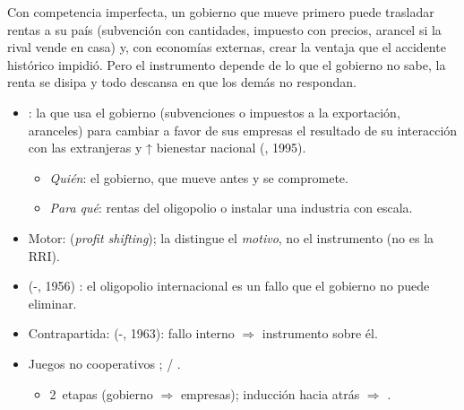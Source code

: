 \documentclass{article}
\begin{document}
\begin{columnas}
\begin{ideaclave}
Con competencia imperfecta, un gobierno que mueve primero puede trasladar rentas a su país (subvención con cantidades, impuesto con precios, arancel si la rival vende en casa) y, con economías externas, crear la ventaja que el accidente histórico impidió. Pero el instrumento depende de lo que el gobierno no sabe, la renta se disipa y todo descansa en que los demás no respondan.
\end{ideaclave}

\begin{itemize}
\item {}: la que usa el gobierno (subvenciones o impuestos a la exportación, aranceles) para cambiar a favor de sus empresas el resultado de su interacción con las extranjeras y ↑ bienestar nacional (, 1995).
  \begin{itemize}
  \item \emph{Quién}: el gobierno, que mueve antes y se compromete.
  \item \emph{Para qué}: rentas del oligopolio o instalar una industria con escala.
  \end{itemize}
\item Motor:  (\emph{profit shifting}); la distingue el \emph{motivo}, no el instrumento (no es la RRI).
\end{itemize}
\begin{itemize}
\item {} (-, 1956) : el oligopolio internacional es un fallo que el gobierno no puede eliminar.
\item Contrapartida:  (-, 1963): fallo interno $\Rightarrow$ instrumento sobre él.
\end{itemize}
\begin{itemize}
\item Juegos no cooperativos ; / .
  \begin{itemize}
  \item 2~etapas (gobierno $\Rightarrow$ empresas); inducción hacia atrás $\Rightarrow$ .

\end{itemize}
\end{itemize}
\end{columnas}
\end{document}
